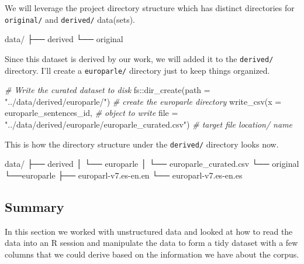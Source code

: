 \documentclass[
  letterpaper,
  DIV=11,
  numbers=noendperiod]{scrreport}
\newenvironment{Shaded}{\begin{snugshade}}{\end{snugshade}}
\newcommand{\AttributeTok}[1]{\textcolor[rgb]{0.00,0.00,0.00}{#1}}
\newcommand{\CommentTok}[1]{\textcolor[rgb]{0.00,0.00,0.00}{\textit{#1}}}
\newcommand{\ExtensionTok}[1]{\textcolor[rgb]{0.00,0.00,0.00}{#1}}
\newcommand{\FunctionTok}[1]{\textcolor[rgb]{0.00,0.00,0.00}{#1}}
\newcommand{\NormalTok}[1]{\textcolor[rgb]{0.00,0.00,0.00}{#1}}
\newcommand{\SpecialCharTok}[1]{\textcolor[rgb]{0.00,0.00,0.00}{#1}}
\newcommand{\StringTok}[1]{\textcolor[rgb]{0.00,0.00,0.00}{#1}}
\theoremstyle{definition}
\theoremstyle{remark}
\begin{document}
We will leverage the project directory structure which has distinct
directories for \texttt{original/} and \texttt{derived/} data(sets).

\begin{Shaded}
\begin{Highlighting}[]
\ExtensionTok{data/}
\ExtensionTok{├──}\NormalTok{ derived}
\ExtensionTok{└──}\NormalTok{ original}
\end{Highlighting}
\end{Shaded}

Since this dataset is derived by our work, we will added it to the
\texttt{derived/} directory. I'll create a \texttt{europarle/} directory
just to keep things organized.

\begin{Shaded}
\begin{Highlighting}[]
\CommentTok{\# Write the curated dataset to disk}
\NormalTok{fs}\SpecialCharTok{::}\FunctionTok{dir\_create}\NormalTok{(}\AttributeTok{path =} \StringTok{"../data/derived/europarle/"}\NormalTok{) }\CommentTok{\# create the europarle directory}
\FunctionTok{write\_csv}\NormalTok{(}\AttributeTok{x =}\NormalTok{ europarle\_sentences\_id, }\CommentTok{\# object to write}
          \AttributeTok{file =} \StringTok{"../data/derived/europarle/europarle\_curated.csv"}\NormalTok{) }\CommentTok{\# target file location/ name}
\end{Highlighting}
\end{Shaded}

This is how the directory structure under the \texttt{derived/}
directory looks now.

\begin{Shaded}
\begin{Highlighting}[]
\ExtensionTok{data/}
\ExtensionTok{├──}\NormalTok{ derived}
\ExtensionTok{│}\NormalTok{   └── europarle}
\ExtensionTok{│}\NormalTok{       └── europarle\_curated.csv}
\ExtensionTok{└──}\NormalTok{ original}
    \ExtensionTok{└──europarle}
        \ExtensionTok{├──}\NormalTok{ europarl{-}v7.es{-}en.en}
        \ExtensionTok{└──}\NormalTok{ europarl{-}v7.es{-}en.es}
\end{Highlighting}
\end{Shaded}

\hypertarget{summary-5}{%
\subsection{Summary}\label{summary-5}}

In this section we worked with unstructured data and looked at how to
read the data into an R session and manipulate the data to form a tidy
dataset with a few columns that we could derive based on the information
we have about the corpus.
\end{document}
